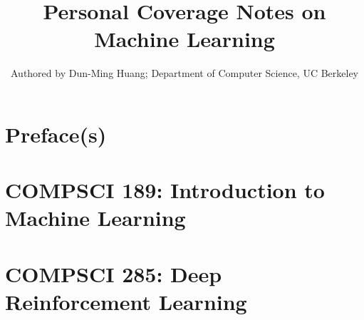 \documentclass[openany]{book}
\title{Personal Coverage Notes on Machine Learning}
\author{Authored by Dun-Ming Huang; Department of Computer Science, UC Berkeley}
\begin{document}
\maketitle
\setcounter{tocdepth}{1}
\part*{Preface(s)}

\tableofcontents
\part{COMPSCI 189: Introduction to Machine Learning}

\newpage

\newpage

\newpage

\newpage

\newpage

\newpage

\newpage

\newpage

\newpage

\newpage

\newpage

\newpage

\newpage

\newpage

\newpage

\newpage

\newpage

\newpage

\newpage

\newpage

\newpage

\newpage

\newpage


\part{COMPSCI 285: Deep Reinforcement Learning}

\newpage

\newpage

\newpage

\newpage

\newpage

\newpage

\newpage

\newpage

\newpage

\newpage

\newpage

\newpage

\newpage

\newpage

\newpage

\newpage

\newpage

\newpage

\newpage

\newpage

\newpage

\end{document}

